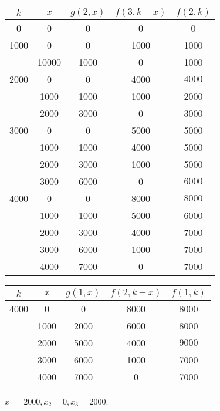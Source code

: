 \documentclass[twoside]{article}
\begin{document}
\begin{ejercicio}{1}
\begin{solucion}
\begin{tabular}{|c| c| c| c| c|}
\hline
$k$ & $x$ & $g(2,x)$ & $f(3,k-x)$ & $f(2,k)$\\
\hline
0   &  0  & 0        &  0      &  0\\
\hline
\hline
1000    &  0  & 0       &   1000 & 1000\\
     &  10000  & 1000 & 0         & 1000\\
     \hline
     \hline
2000 &  0     & 0        &  4000 & $\boxed{4000}$\\
  &  1000     & 1000     & 1000  & 2000\\
  &  2000     & 3000     &  0    & 3000\\
  \hline
  \hline
3000 & 0	& 0	& 5000 & 5000\\
	 & 1000 & 1000 & 4000 & 5000\\
	 & 2000 & 3000 & 1000 & 5000\\
	 & 3000 & 6000 & 0  & $\boxed{6000}$\\
\hline
\hline
4000 & 0   & 0 & 8000 & $\boxed{8000}$\\
	 & 1000 & 1000 & 5000 & 6000\\
	 & 2000 & 3000 & 4000 & 7000\\
	 & 3000 & 6000 & 1000 & 7000\\
	 & 4000 & 7000 & 0 & 7000\\
	 \hline
\end{tabular}

\vspace{0.5em}

\begin{tabular}{|c|c|c|c|c|}
\hline
$k$ & $x$ & $g(1,x)$ & $f(2,k-x)$ &$f(1,k)$\\
\hline
4000 & 0   & 0       &  8000 & 8000\\
	 & 1000 & 2000   &   6000 & 8000 \\
	 & 2000 &  5000 &   4000 & $\boxed{9000}$\\
	 & 3000 & 6000  &   1000 & 7000\\
	 & 4000 & 7000 &   0     & 7000\\
	 \hline
\end{tabular}

\vspace{0.5em}

$x_1=2000, x_2=0, x_3=2000$.
\end{solucion}
\end{ejercicio}
\end{document}
